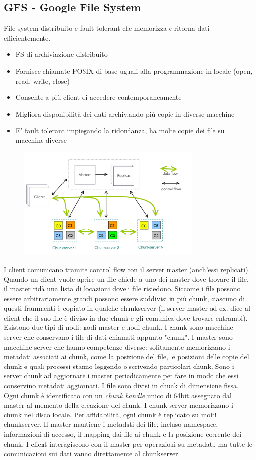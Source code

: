 \documentclass[12pt,italian]{report}
\begin{document}
\subsection{GFS - Google File System}
File system distribuito e fault-tolerant che memorizza e ritorna dati efficientemente. 
\begin{itemize}
    \item FS di archiviazione distribuito
    \item Fornisce chiamate POSIX di base uguali alla programmazione in locale (open, read, write, close)
    \item Consente a più client di accedere contemporaneamente
    \item Migliora disponibilità dei dati archiviando più copie in diverse macchine
    \item E' fault tolerant impiegando la ridondanza, ha molte copie dei file su macchine diverse
\end{itemize}

\begin{figure}[h]
\centering
\includegraphics[width=90mm]{img/gfs.PNG}
\end{figure}
I client comunicano tramite control flow con il server master (anch'essi replicati). Quando un client vuole aprire un file chiede a uno dei master dove trovare il file, il master ridà una lista di locazioni dove i file risiedono. Siccome i file possono essere arbitrariamente grandi possono essere suddivisi in più chunk, ciascuno di questi frammenti è copiato in qualche chunkserver (il server master ad ex. dice al client che il suo file è diviso in due chunk e gli comunica dove trovare entrambi).
\bigbreak
Esistono due tipi di nodi: nodi master e nodi chunk. I chunk sono macchine server che conservano i file di dati chiamati appunto "chunk". I master sono macchine server che hanno competenze diverse: solitamente memorizzano i metadati associati ai chunk, come la posizione del file, le posizioni delle copie del chunk e quali processi stanno leggendo o scrivendo particolari chunk. Sono i server chunk ad aggiornare i master periodicamente per fare in modo che essi conservino metadati aggiornati. 
\bigbreak
I file sono divisi in chunk di dimensione fissa. Ogni chunk è identificato con un \textit{chunk handle} unico di 64bit assegnato dal master al momento della creazione del chunk. I chunk-server memorizzano i chunk nel disco locale. Per affidabilità, ogni chunk è replicato su molti chunkserver. Il master mantiene i metadati dei file, incluso namespace, informazioni di accesso, il mapping dai file ai chunk e la posizione corrente dei chunk. I client interagiscono con il master per operazioni su metadati, ma tutte le comunicazioni sui dati vanno direttamente al chunkserver. 
\end{document}
